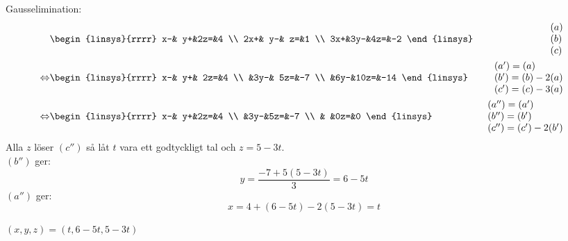 \begin{task}{1.12}
	Gausselimination:
	\begin{align*}
		&\begin{linsys}{rrrr}
			 x-& y+&2z=&4 \\
			2x+& y-& z=&1 \\
			3x+&3y-&4z=&-2
		\end{linsys}
		&\begin{array}{l} 
			(a) \\ 
			(b) \\
			(c) 
		\end{array} \\ \lra
		&\begin{linsys}{rrrr}
			x-& y+& 2z=&4 \\
			  &3y-& 5z=&-7 \\
			  &6y-&10z=&-14
		\end{linsys}
		&\begin{array}{l} 
			(a')=(a) \\ 
			(b')=(b)-2(a) \\
			(c')=(c)-3(a)
		\end{array} \\ \lra
		&\begin{linsys}{rrrr}
			x-& y+&2z=&4 \\
			  &3y-&5z=&-7 \\
			  &   &0z=&0
		\end{linsys}
		&\begin{array}{l} 
			(a'')=(a') \\ 
			(b'')=(b') \\
			(c'')=(c')-2(b')
		\end{array}
	\end{align*}
	Alla $z$ löser $(c'')$ så låt $t$ vara ett godtyckligt tal och $z=5-3t$. \\
	$(b'')$ ger:
	\[y=\frac{-7+5(5-3t)}{3}=6-5t\]
	$(a'')$ ger:
	\[x=4+(6-5t)-2(5-3t)=t\]

	\ans $(x,y,z)=(t,6-5t,5-3t)$
\end{task}


